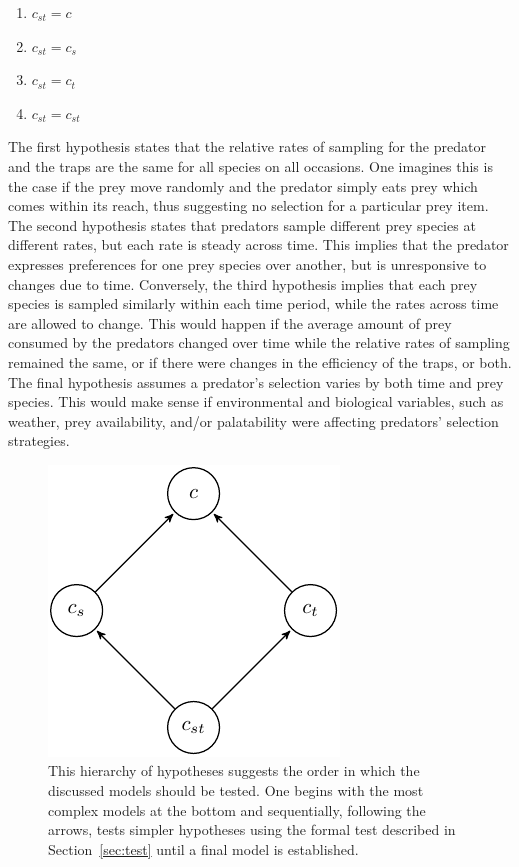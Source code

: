 \documentclass[smallextended]{svjour3}
\begin{document}
\begin{enumerate}
\item $c_{st} = c$
\item $c_{st} = c_s$
\item $c_{st} = c_t$
\item $c_{st} = c_{st}$
\end{enumerate}

\noindent The first hypothesis states that the relative rates of sampling for the predator and the traps are the same for all species on all occasions.  One imagines this is the case if the prey move randomly and the predator simply eats prey which comes within its reach, thus suggesting no selection for a particular prey item.  The second hypothesis states that predators sample different prey species at different rates, but each rate is steady across time.  This implies that the predator expresses preferences for one prey species over another, but is unresponsive to changes due to time.  Conversely, the third hypothesis implies that each prey species is sampled similarly within each time period, while the rates across time are allowed to change. This would happen if the average amount of prey consumed by the predators changed over time while the relative rates of sampling remained the same, or if there were changes in the efficiency of the traps, or both. The final hypothesis assumes a predator's selection varies by both time and prey species.  This would make sense if environmental and biological variables, such as weather, prey availability, and/or palatability were affecting predators' selection strategies.  

\begin{figure}
  \centering
  \includegraphics{hyps.pdf}
  \caption{This hierarchy of hypotheses suggests the order in which the discussed models should be tested.  One begins with the most complex models at the bottom and sequentially, following the arrows, tests simpler hypotheses using the formal test described in Section~\ref{sec:test} until a final model is established.}
  \label{fig:hier}
\end{figure}
\end{document}
